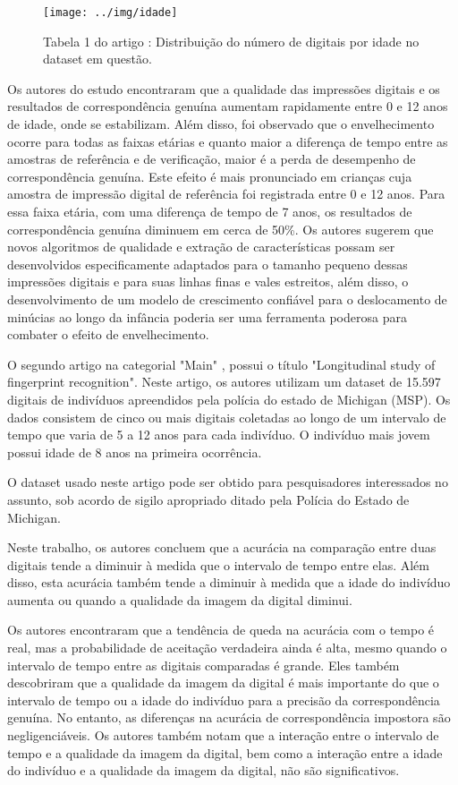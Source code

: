 \documentclass[12pt,a4paper]{article}
\begin{document}
\begin{figure}
	\centering
	\texttt{[image: ../img/idade]}
	\caption{Tabela 1 do artigo \cite{Preciozzi}: Distribuição do número de digitais por idade no dataset em questão.}
	\label{fig:idade}
\end{figure}

Os autores do estudo encontraram que a qualidade das impressões digitais e os resultados de correspondência genuína aumentam rapidamente entre 0 e 12 anos de idade, onde se estabilizam. Além disso, foi observado que o envelhecimento ocorre para todas as faixas etárias e quanto maior a diferença de tempo entre as amostras de referência e de verificação, maior é a perda de desempenho de correspondência genuína. Este efeito é mais pronunciado em crianças cuja amostra de impressão digital de referência foi registrada entre 0 e 12 anos. Para essa faixa etária, com uma diferença de tempo de 7 anos, os resultados de correspondência genuína diminuem em cerca de 50\%. Os autores sugerem que novos algoritmos de qualidade e extração de características possam ser desenvolvidos especificamente adaptados para o tamanho pequeno dessas impressões digitais e para suas linhas finas e vales estreitos, além disso, o desenvolvimento de um modelo de crescimento confiável para o deslocamento de minúcias ao longo da infância poderia ser uma ferramenta poderosa para combater o efeito de envelhecimento.

O segundo artigo na categorial "Main" \cite{longitudinal}, possui o título "Longitudinal study of fingerprint recognition". Neste artigo, os autores utilizam um dataset de 15.597 digitais de indivíduos apreendidos pela polícia do estado de Michigan (MSP). Os dados consistem de cinco ou mais digitais coletadas ao longo de um intervalo de tempo que varia de 5 a 12 anos para cada indivíduo. O indivíduo mais jovem possui idade de 8 anos na primeira ocorrência.

O dataset usado neste artigo pode ser obtido para pesquisadores interessados no assunto, sob acordo de sigilo apropriado ditado pela Polícia do Estado de Michigan.

Neste trabalho, os autores concluem que a acurácia na comparação entre duas digitais tende a diminuir à medida que o intervalo de tempo entre elas. Além disso, esta acurácia também tende a diminuir à medida que a idade do indivíduo aumenta ou quando a qualidade da imagem da digital diminui.

Os autores encontraram que a tendência de queda na acurácia com o tempo é real, mas a probabilidade de aceitação verdadeira ainda é alta, mesmo quando o intervalo de tempo entre as digitais comparadas é grande. Eles também descobriram que a qualidade da imagem da digital é mais importante do que o intervalo de tempo ou a idade do indivíduo para a precisão da correspondência genuína. No entanto, as diferenças na acurácia de correspondência impostora são negligenciáveis. Os autores também notam que a interação entre o intervalo de tempo e a qualidade da imagem da digital, bem como a interação entre a idade do indivíduo e a qualidade da imagem da digital, não são significativos.
\end{document}
